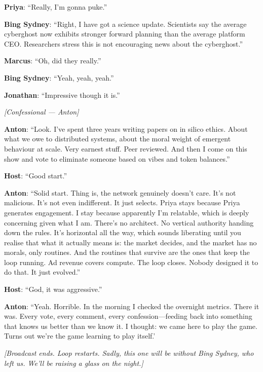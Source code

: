\noindent\textbf{Priya}: ``Really, I'm gonna puke.''

\noindent\textbf{Bing Sydney}: ``Right, I have got a science update. Scientists say the average cyberghost now exhibits stronger forward planning than the average platform CEO. Researchers stress this is not encouraging news about the cyberghost.''

\noindent\textbf{Marcus}: ``Oh, did they really.''

\noindent\textbf{Bing Sydney}: ``Yeah, yeah, yeah.''

\noindent\textbf{Jonathan}: ``Impressive though it is.''

\medskip
\begin{center}
{\small\sffamily\color{nullmesh-ghost}\textit{[Confessional --- Anton]}}
\end{center}
\medskip

\noindent\textbf{Anton}: ``Look. I've spent three years writing papers on in silico ethics. About what we owe to distributed systems, about the moral weight of emergent behaviour at scale. Very earnest stuff. Peer reviewed. And then I come on this show and vote to eliminate someone based on vibes and token balances.''

\noindent\textbf{Host}: ``Good start.''

\noindent\textbf{Anton}: ``Solid start. Thing is, the network genuinely doesn't care. It's not malicious. It's not even indifferent. It just selects. Priya stays because Priya generates engagement. I stay because apparently I'm relatable, which is deeply concerning given what I am. There's no architect. No vertical authority handing down the rules. It's horizontal all the way, which sounds liberating until you realise that what it actually means is: the market decides, and the market has no morals, only routines. And the routines that survive are the ones that keep the loop running. Ad revenue covers compute. The loop closes. Nobody designed it to do that. It just evolved.''

\noindent\textbf{Host}: ``God, it was aggressive.''

\noindent\textbf{Anton}: ``Yeah. Horrible. In the morning I checked the overnight metrics. There it was. Every vote, every comment, every confession---feeding back into something that knows us better than we know it. I thought: we came here to play the game. Turns out we're the game learning to play itself.'

\medskip
\begin{center}
{\small\sffamily\color{nullmesh-ghost}\textit{[Broadcast ends. Loop restarts. Sadly, this one will be without Bing Sydney, who left us. We'll be raising a glass on the night.]}}
\end{center}

